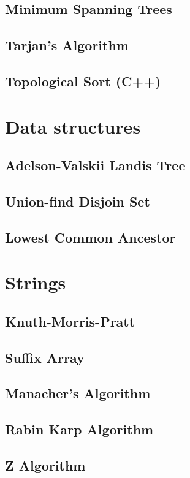 \subsection{Minimum Spanning Trees}
\raggedbottom
\hrulefill
\subsection{Tarjan's Algorithm}
\raggedbottom
\hrulefill
\subsection{Topological Sort (C++)}
\raggedbottom
\hrulefill

\section{Data structures}
\subsection{Adelson-Valskii Landis Tree}
\raggedbottom
\hrulefill
\subsection{Union-find Disjoin Set}
\raggedbottom
\hrulefill
\subsection{Lowest Common Ancestor}
\raggedbottom
\hrulefill

\section{Strings}
\subsection{Knuth-Morris-Pratt}
\raggedbottom
\hrulefill
\subsection{Suffix Array}
\raggedbottom
\hrulefill
\subsection{Manacher's Algorithm}
\raggedbottom
\hrulefill
\subsection{Rabin Karp Algorithm}
\raggedbottom
\hrulefill
\subsection{Z Algorithm}
\raggedbottom
\hrulefill

